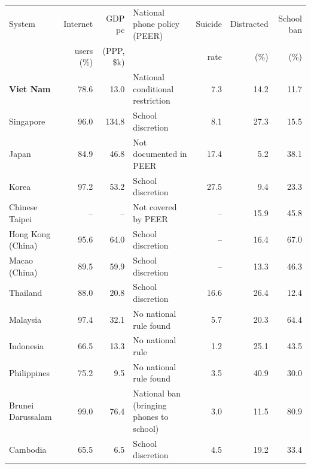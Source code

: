 \begin{tabular}{@{}lrrp{4.2cm}rrr@{}}
\toprule
System & Internet & GDP pc & National phone policy (PEER) & Suicide & Distracted & School ban \\
 & users (\%) & (PPP, \$k) & & rate & (\%) & (\%) \\
\midrule
\textbf{Viet Nam} & 78.6 & 13.0 & National conditional restriction & 7.3 & 14.2 & 11.7 \\
Singapore & 96.0 & 134.8 & School discretion & 8.1 & 27.3 & 15.5 \\
Japan & 84.9 & 46.8 & Not documented in PEER & 17.4 & 5.2 & 38.1 \\
Korea & 97.2 & 53.2 & School discretion & 27.5 & 9.4 & 23.3 \\
Chinese Taipei & -- & -- & Not covered by PEER & -- & 15.9 & 45.8 \\
Hong Kong (China) & 95.6 & 64.0 & School discretion & -- & 16.4 & 67.0 \\
Macao (China) & 89.5 & 59.9 & School discretion & -- & 13.3 & 46.3 \\
Thailand & 88.0 & 20.8 & School discretion & 16.6 & 26.4 & 12.4 \\
Malaysia & 97.4 & 32.1 & No national rule found & 5.7 & 20.3 & 64.4 \\
Indonesia & 66.5 & 13.3 & No national rule & 1.2 & 25.1 & 43.5 \\
Philippines & 75.2 & 9.5 & No national rule found & 3.5 & 40.9 & 30.0 \\
Brunei Darussalam & 99.0 & 76.4 & National ban (bringing phones to school) & 3.0 & 11.5 & 80.9 \\
Cambodia & 65.5 & 6.5 & School discretion & 4.5 & 19.2 & 33.4 \\
\bottomrule
\end{tabular}
